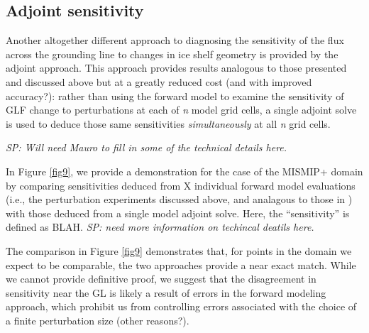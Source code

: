 \documentclass[review,oneside]{igs}
\begin{document}
\subsection{Adjoint sensitivity}

Another altogether different approach to diagnosing the sensitivity of the flux across the grounding line to changes in ice shelf geometry is provided by the adjoint approach. This approach provides results analogous to those presented and discussed above but at a greatly reduced cost (and with improved accuracy?): rather than using the forward model to examine the sensitivity of GLF change to perturbations at each of \textit{n} model grid cells, a single adjoint solve is used to deduce those same sensitivities \textit{simultaneously} at all \textit{n} grid cells. 

\textit{SP: Will need Mauro to fill in some of the technical details here.}

In Figure \ref{fig9}, we provide a demonstration for the case of the MISMIP+ domain by comparing sensitivities deduced from X individual forward model evaluations (i.e., the perturbation experiments discussed above, and analagous to those in \citet{reese2018}) with those deduced from a single model adjoint solve. Here, the ``sensitivity'' is defined as BLAH. \textit{SP: need more information on techincal deatils here.} 

The comparison in Figure \ref{fig9} demonstrates that, for points in the domain we expect to be comparable, the two approaches provide a near exact match. While we cannot provide definitive proof, we suggest that the disagreement in sensitivity near the GL is likely a result of errors in the forward modeling approach, which prohibit us from controlling errors associated with the choice of a finite perturbation size (other reasons?).
\end{document}
